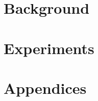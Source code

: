 \documentclass[12pt,a4paper]{article}
\numberwithin{figure}{section}
\numberwithin{table}{section}
\numberwithin{algorithm}{section}
\begin{document}
\part{Background}









%

\part{Experiments}



%








\part{Appendices}
\appendix


 

%

%
\end{document}
